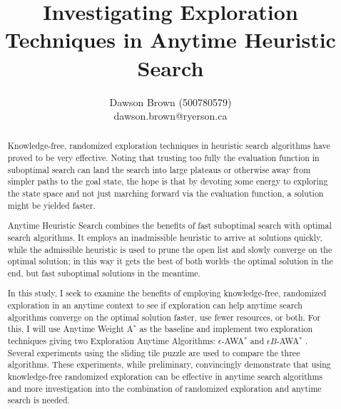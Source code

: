 \documentclass[letterpaper]{article}
\title{Investigating Exploration Techniques in Anytime Heuristic Search}
\author{Dawson Brown (500780579)\\dawson.brown@ryerson.ca}
\date{}
\newcommand{\eawa}{$\epsilon$-AWA$^*$ }
\newcommand{\ebawa}{$\epsilon B$-AWA$^*$ }
\begin{document}
\maketitle
\pagestyle{plain}

\begin{abstract}
    Knowledge-free, randomized exploration techniques in heuristic search algorithms have proved to be very effective. Noting that trusting too fully the evaluation function in suboptimal search can land the search into large plateaus or otherwise away from simpler paths to the goal state, the hope is that by devoting some energy to exploring the state space and not just marching forward via the evaluation function, a solution might be yielded faster. 
    
    Anytime Heuristic Search combines the benefits of fast suboptimal search with optimal search algorithms. It employs an inadmissible heuristic to arrive at solutions quickly, while the admissible heuristic is used to prune the open list and slowly converge on the optimal solution; in this way it gets the best of both worlds--the optimal solution in the end, but fast suboptimal solutions in the meantime. 
    
    In this study, I seek to examine the benefits of employing knowledge-free, randomized exploration in an anytime context to see if exploration can help anytime search algorithms converge on the optimal solution faster, use fewer resources, or both. For this, I will use Anytime Weight A$^*$ as the baseline and implement two exploration techniques giving two Exploration Anytime Algorithms: \eawa and \ebawa. Several experiments using the sliding tile puzzle are used to compare the three algorithms. These experiments, while preliminary, convincingly demonstrate that using knowledge-free randomized exploration can be effective in anytime search algorithms and more investigation into the combination of randomized exploration and anytime search is needed. 
\end{abstract}














\newpage

% 
\end{document}
